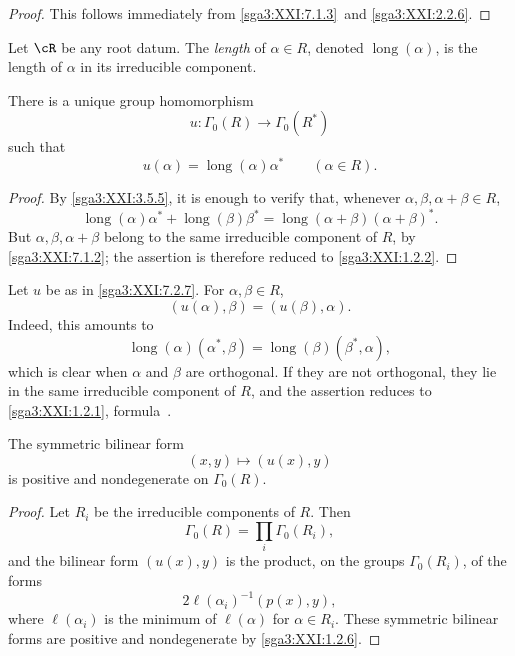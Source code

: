 \begin{proof}
This follows immediately from \ref{sga3:XXI:7.1.3}\, and
\ref{sga3:XXI:2.2.6}.
\end{proof}

\begin{definition}\label{sga3:XXI:7.2.6}
Let \(\cR\) be any root datum.  The \emph{length} of
\(\alpha\in R\), denoted \(\operatorname{long}(\alpha)\), is the
length of \(\alpha\) in its irreducible component.
\end{definition}

\begin{lemma}\label{sga3:XXI:7.2.7}
There is a unique group homomorphism
\[
 u:\Gamma_0(R)\longrightarrow\Gamma_0(R^\ast)
\]
such that
\[
 u(\alpha)=\operatorname{long}(\alpha)\alpha^\ast
 \qquad(\alpha\in R).
\]
\end{lemma}

\begin{proof}
By \ref{sga3:XXI:3.5.5}, it is enough to verify that, whenever
\(\alpha,\beta,\alpha+\beta\in R\),
\[
 \operatorname{long}(\alpha)\alpha^\ast+
 \operatorname{long}(\beta)\beta^\ast
 =
 \operatorname{long}(\alpha+\beta)(\alpha+\beta)^\ast.
\]
But \(\alpha,\beta,\alpha+\beta\) belong to the same irreducible
component of \(R\), by \ref{sga3:XXI:7.1.2}; the assertion is
therefore reduced to \ref{sga3:XXI:1.2.2}.
\end{proof}

\begin{remark}\label{sga3:XXI:7.2.8}
Let \(u\) be as in \ref{sga3:XXI:7.2.7}.  For
\(\alpha,\beta\in R\),
\[
 (u(\alpha),\beta)=(u(\beta),\alpha).
\]
Indeed, this amounts to
\[
 \operatorname{long}(\alpha)(\alpha^\ast,\beta)
 =
 \operatorname{long}(\beta)(\beta^\ast,\alpha),
\]
which is clear when \(\alpha\) and \(\beta\) are orthogonal.  If
they are not orthogonal, they lie in the same irreducible component
of \(R\), and the assertion reduces to \ref{sga3:XXI:1.2.1},
formula~.
\end{remark}

\begin{remark}\label{sga3:XXI:7.2.9}
The symmetric bilinear form
\[
 (x,y)\longmapsto(u(x),y)
\]
is positive and nondegenerate on \(\Gamma_0(R)\).
\end{remark}

\begin{proof}
Let \(R_i\) be the irreducible components of \(R\).  Then
\[
 \Gamma_0(R)=\prod_i\Gamma_0(R_i),
\]
and the bilinear form \((u(x),y)\) is the product, on the groups
\(\Gamma_0(R_i)\), of the forms
\[
 2\ell(\alpha_i)^{-1}(p(x),y),
\]
where \(\ell(\alpha_i)\) is the minimum of \(\ell(\alpha)\) for
\(\alpha\in R_i\).  These symmetric bilinear forms are positive
and nondegenerate by \ref{sga3:XXI:1.2.6}.
\end{proof}

